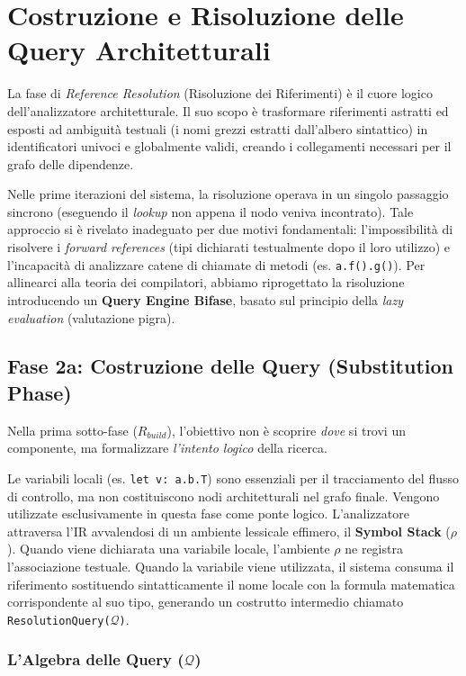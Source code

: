 \chapter{Costruzione e Risoluzione delle Query Architetturali}
\label{ch:name_resolution}

La fase di \textit{Reference Resolution} (Risoluzione dei
Riferimenti) è il cuore logico dell'analizzatore architetturale. Il
suo scopo è trasformare riferimenti astratti ed esposti ad ambiguità
testuali (i nomi grezzi estratti dall'albero sintattico) in
identificatori univoci e globalmente validi, creando i collegamenti
necessari per il grafo delle dipendenze.

Nelle prime iterazioni del sistema, la risoluzione operava in un
singolo passaggio sincrono (eseguendo il \textit{lookup} non appena
il nodo veniva incontrato). Tale approccio si è rivelato inadeguato
per due motivi fondamentali: l'impossibilità di risolvere i
\textit{forward references} (tipi dichiarati testualmente dopo il
loro utilizzo) e l'incapacità di analizzare catene di chiamate di
metodi (es. \texttt{a.f().g()}).
Per allinearci alla teoria dei compilatori, abbiamo riprogettato la
risoluzione introducendo un \textbf{Query Engine Bifase}, basato sul
principio della \textit{lazy evaluation} (valutazione pigra).

\section{Fase 2a: Costruzione delle Query (Substitution Phase)}

Nella prima sotto-fase ($R_{build}$), l'obiettivo non è scoprire
\textit{dove} si trovi un componente, ma formalizzare
\textit{l'intento logico} della ricerca.

Le variabili locali (es. \texttt{let v: a.b.T}) sono essenziali per
il tracciamento del flusso di controllo, ma non costituiscono nodi
architetturali nel grafo finale. Vengono utilizzate esclusivamente in
questa fase come ponte logico. L'analizzatore attraversa l'IR
avvalendosi di un ambiente lessicale effimero, il \textbf{Symbol
Stack} ($\rho$).
Quando viene dichiarata una variabile locale, l'ambiente $\rho$ ne
registra l'associazione testuale. Quando la variabile viene
utilizzata, il sistema consuma il riferimento sostituendo
sintatticamente il nome locale con la formula matematica
corrispondente al suo tipo, generando un costrutto intermedio
chiamato \texttt{ResolutionQuery($\mathcal{Q}$)}.

\subsection{L'Algebra delle Query ($\mathcal{Q}$)}

